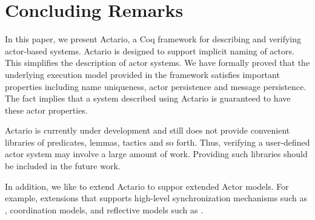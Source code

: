 \section{Concluding Remarks}
\label{sec:conclusion}

In this paper, we present Actario, a Coq framework for describing and
verifying actor-based systems. Actario is designed to support implicit
naming of actors. This simplifies the description of actor systems.
We have formally proved that the underlying execution model provided
in the framework satisfies important properties including name
uniqueness, actor persistence and message persistence.  The fact
implies that a system described using Actario is guaranteed to have
these actor properties.

Actario is currently under development and still does not provide
convenient libraries of predicates, lemmas, tactics and so
forth. Thus, verifying a user-defined actor system may involve a large
amount of work. Providing such libraries should be included in the
future work.

In addition, we like to extend Actario to suppor extended Actor
models. For example, extensions that supports high-level
synchronization mechanisms such as \cite{De-Koster:2012aa},
coordination models\cite{Talcott:2011aa}, and reflective models such
as \cite{Watanabe:2013aa}.




